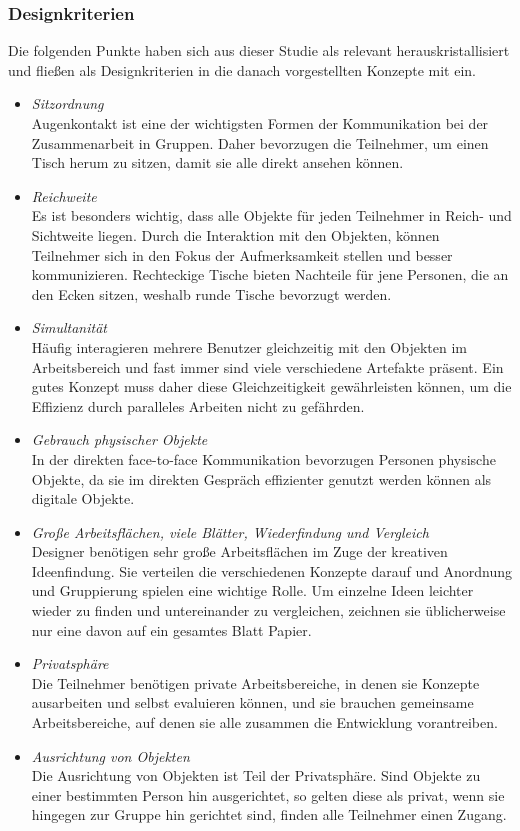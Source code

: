\subsubsection{Designkriterien}

Die folgenden Punkte haben sich aus dieser Studie als relevant herauskristallisiert und fließen als Designkriterien in die danach vorgestellten Konzepte mit ein.

\begin{itemize} 
	\item{\emph{Sitzordnung}}\\
	Augenkontakt ist eine der wichtigsten Formen der Kommunikation bei der Zusammenarbeit in Gruppen. Daher bevorzugen die Teilnehmer, um einen Tisch herum zu sitzen, damit sie alle direkt ansehen können.
	\item{\emph{Reichweite}}\\
	Es ist besonders wichtig, dass alle Objekte für jeden Teilnehmer in Reich- und Sichtweite liegen. Durch die Interaktion mit den Objekten, können Teilnehmer sich in den Fokus der Aufmerksamkeit stellen und besser kommunizieren. Rechteckige Tische bieten Nachteile für jene Personen, die an den Ecken sitzen, weshalb runde Tische bevorzugt werden.
	\item{\emph{Simultanität}}\\
	Häufig interagieren mehrere Benutzer gleichzeitig mit den Objekten im Arbeitsbereich und fast immer sind viele verschiedene Artefakte präsent. Ein gutes Konzept muss daher diese Gleichzeitigkeit gewährleisten können, um die Effizienz durch paralleles Arbeiten nicht zu gefährden.
	\item{\emph{Gebrauch physischer Objekte}}\\
	In der direkten face-to-face Kommunikation bevorzugen Personen physische Objekte, da sie im direkten Gespräch effizienter genutzt werden können als digitale Objekte.
	\item{\emph{Große Arbeitsflächen, viele Blätter, Wiederfindung und Vergleich}}\\
	Designer benötigen sehr große Arbeitsflächen im Zuge der kreativen Ideenfindung. Sie verteilen die verschiedenen Konzepte darauf und Anordnung und Gruppierung spielen eine wichtige Rolle. Um einzelne Ideen leichter wieder zu finden und untereinander zu vergleichen, zeichnen sie üblicherweise nur eine davon auf ein gesamtes Blatt Papier.
	\item{\emph{Privatsphäre}}\\
	Die Teilnehmer benötigen private Arbeitsbereiche, in denen sie Konzepte ausarbeiten und selbst evaluieren können, und sie brauchen gemeinsame Arbeitsbereiche, auf denen sie alle zusammen die Entwicklung vorantreiben.
	\item{\emph{Ausrichtung von Objekten}}\\
	Die Ausrichtung von Objekten ist Teil der Privatsphäre. Sind Objekte zu einer bestimmten Person hin ausgerichtet, so gelten diese als privat, wenn sie hingegen zur Gruppe hin gerichtet sind, finden alle Teilnehmer einen Zugang.
\end{itemize}

